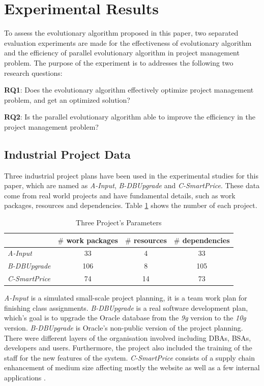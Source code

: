 %
%
\newcommand{\projectA}[0]{\emph{A-Input}}
\newcommand{\projectB}[0]{\emph{B-DBUpgrade}}
\newcommand{\projectC}[0]{\emph{C-SmartPrice}}

\section{Experimental Results}
%
To assess the evolutionary algorithm proposed in this paper, two separated
evaluation experiments are made for the effectiveness of evolutionary algorithm
and the efficiency of parallel evolutionary algorithm in project management
problem. The purpose of the experiment is to addresses the following two
research questions:

\textbf{RQ1}: Does the evolutionary algorithm effectively optimize project
management problem, and get an optimized solution?

\textbf{RQ2}: Is the parallel evolutionary algorithm able to improve the
efficiency in the project management problem?


\subsection{Industrial Project Data}
%
Three industrial project plans have been used in the experimental studies for
this paper, which are named as \projectA{}, \projectB{} and \projectC{}. These
data come from real world projects and have fundamental details, such as work
packages, resources and dependencies. Table \ref{tab:statis} shows the number of
each project.

% 
\begin{table}[!h]
  \centering
  \caption{Three Project's Parameters}
  \label{tab:statis}
  \begin{tabular}{lccc}
    \hline
      & $\#$ work packages & $\#$ resources & $\#$ dependencies \\
    \hline
    \projectA{} & 33  & 4  & 33  \\
    \projectB{} & 106 & 8  & 105 \\
    \projectC{} & 74  & 14 & 73  \\
    \hline
  \end{tabular}
\end{table}

\projectA{} is a simulated small-scale project planning, it is a team work plan
for finishing class assignments. \projectB{} is a real software development
plan, which's goal is to upgrade the Oracle database from the \emph{9g} version
to the \emph{10g} version. \projectB{} is Oracle's non-public version of the
project planning. There were different layers of the organisation involved
including DBAs, BSAs, developers and users.  Furthermore, the project also
included the training of the staff for the new features of the
system. \projectC{} consists of a supply chain enhancement of medium size
affecting mostly the website as well as a few internal applications \cite{ren2}.

